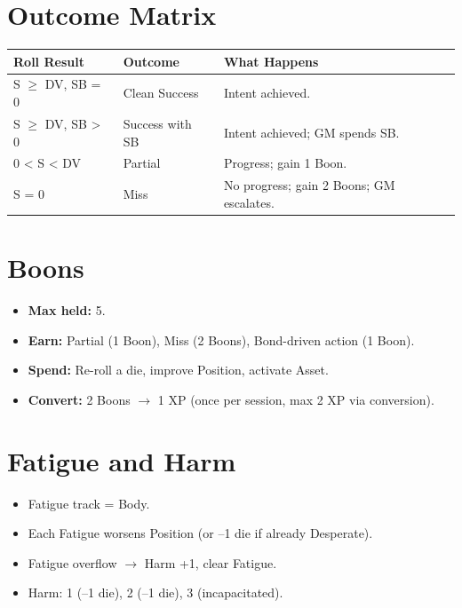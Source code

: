 \documentclass[11pt]{book}
\begin{document}
\section{Outcome Matrix}

\begin{center}
\begin{tabular}{lll}
\toprule
\textbf{Roll Result} & \textbf{Outcome} & \textbf{What Happens} \\
\midrule
S $\ge$ DV, SB = 0 & Clean Success & Intent achieved. \\
S $\ge$ DV, SB > 0 & Success with SB & Intent achieved; GM spends SB. \\
0 < S < DV & Partial & Progress; gain 1 Boon. \\
S = 0 & Miss & No progress; gain 2 Boons; GM escalates. \\
\bottomrule
\end{tabular}
\end{center}

\section{Boons}

\begin{itemize}
  \item \textbf{Max held:} 5.
  \item \textbf{Earn:} Partial (1 Boon), Miss (2 Boons), Bond-driven action (1 Boon).
  \item \textbf{Spend:} Re-roll a die, improve Position, activate Asset.
  \item \textbf{Convert:} 2 Boons $\rightarrow$ 1 XP (once per session, max 2 XP via conversion).
\end{itemize}

\section{Fatigue and Harm}

\begin{itemize}
  \item Fatigue track = Body.
  \item Each Fatigue worsens Position (or --1 die if already Desperate).
  \item Fatigue overflow $\rightarrow$ Harm +1, clear Fatigue.
  \item Harm: 1 (--1 die), 2 (--1 die), 3 (incapacitated).
\end{itemize}
\end{document}
